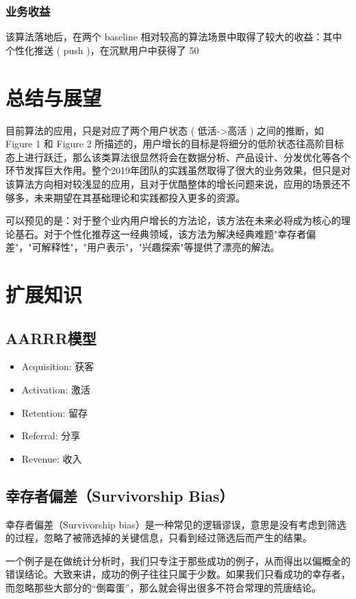 \documentclass[12pt]{article}
\begin{document}
\subsubsection{业务收益}
该算法落地后，在两个 baseline 相对较高的算法场景中取得了较大的收益：其中个性化推送 ( push )，在沉默用户中获得了 50%

\section{总结与展望}
目前算法的应用，只是对应了两个用户状态 ( 低活->高活 ) 之间的推断，如 Figure 1 和 Figure 2 所描述的，用户增长的目标是将细分的低阶状态往高阶目标态上进行跃迁，那么该类算法很显然将会在数据分析、产品设计、分发优化等各个环节发挥巨大作用。整个2019年团队的实践虽然取得了很大的业务效果，但只是对该算法方向相对较浅显的应用，且对于优酷整体的增长问题来说，应用的场景还不够多，未来期望在其基础理论和实践都投入更多的资源。

可以预见的是：对于整个业内用户增长的方法论，该方法在未来必将成为核心的理论基石。对于个性化推荐这一经典领域，该方法为解决经典难题"幸存者偏差"，"可解释性"，"用户表示"，"兴趣探索"等提供了漂亮的解法。

\section{扩展知识}
\subsection{AARRR模型}
\begin{itemize}
\setlength{\itemsep}{0pt}
\setlength{\parsep}{0pt}
\setlength{\parskip}{0pt}
    \item Acquisition:  获客
    \item Activation: 激活
    \item Retention: 留存
    \item Referral: 分享
    \item Revenue: 收入
\end{itemize}

\subsection{幸存者偏差（Survivorship Bias）}
幸存者偏差（Survivorship bias）是一种常见的逻辑谬误，意思是没有考虑到筛选的过程，忽略了被筛选掉的关键信息，只看到经过筛选后而产生的结果。

一个例子是在做统计分析时，我们只专注于那些成功的例子，从而得出以偏概全的错误结论。大致来讲，成功的例子往往只属于少数。如果我们只看成功的幸存者，而忽略那些大部分的“倒霉蛋”，那么就会得出很多不符合常理的荒唐结论。
\end{document}
